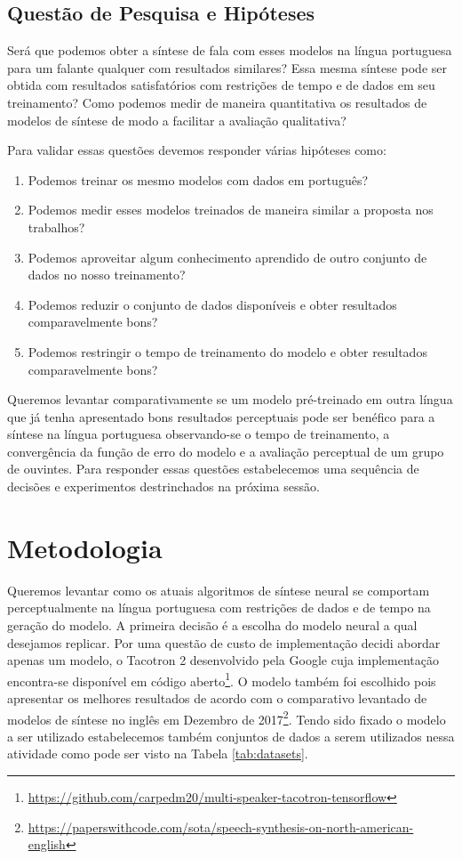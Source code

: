 \documentclass{article}
\begin{document}
\subsection{Questão de Pesquisa e Hipóteses}
\label{sec:hipoteses}
Será que podemos obter a síntese de fala com esses modelos na língua portuguesa para um falante qualquer com resultados similares?
Essa mesma síntese pode ser obtida com resultados satisfatórios com restrições de tempo e de dados em seu treinamento?
Como podemos medir de maneira quantitativa os resultados de modelos de síntese de modo a facilitar a avaliação qualitativa?

Para validar essas questões devemos responder várias hipóteses como:

\begin{enumerate}
	\item \label{it:h1} Podemos treinar os mesmo modelos com dados em português?
	\item \label{it:h2} Podemos medir esses modelos treinados de maneira similar a proposta nos trabalhos?
	\item \label{it:h3} Podemos aproveitar algum conhecimento aprendido de outro conjunto de dados no nosso treinamento? 
	\item \label{it:h4} Podemos reduzir o conjunto de dados disponíveis e obter resultados comparavelmente bons?
	\item \label{it:h5} Podemos restringir o tempo de treinamento do modelo e obter resultados comparavelmente bons?
\end{enumerate}

Queremos levantar comparativamente se um modelo pré-treinado em outra língua que já tenha apresentado bons resultados perceptuais pode ser benéfico para a síntese na língua portuguesa observando-se o tempo de treinamento, a convergência da função de erro do modelo e a avaliação perceptual de um grupo de ouvintes.
Para responder essas questões estabelecemos uma sequência de decisões e experimentos destrinchados na próxima sessão.

\section{Metodologia}

Queremos levantar como os atuais algoritmos de síntese neural se comportam perceptualmente na língua portuguesa com restrições de dados e de tempo na geração do modelo. 
A primeira decisão é a escolha do modelo neural a qual desejamos replicar. 
Por uma questão de custo de implementação decidi abordar apenas um modelo, o Tacotron 2 \cite{tacotron2} desenvolvido pela Google cuja implementação encontra-se disponível em código aberto\footnote{\url{https://github.com/carpedm20/multi-speaker-tacotron-tensorflow}}.
O modelo também foi escolhido pois apresentar os melhores resultados de acordo com o comparativo levantado de modelos de síntese no inglês em Dezembro de 2017\footnote{\url{https://paperswithcode.com/sota/speech-synthesis-on-north-american-english}}.
Tendo sido fixado o modelo a ser utilizado estabelecemos também conjuntos de dados a serem utilizados nessa atividade como pode ser visto na Tabela \ref{tab:datasets}.
\end{document}
